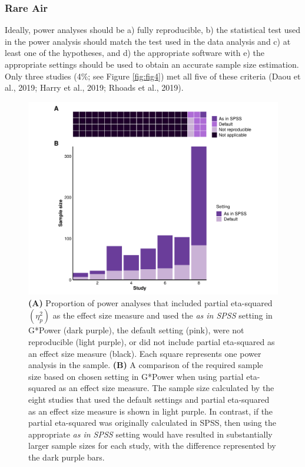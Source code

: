 \documentclass[
  man, donotrepeattitle,mask,floatsintext]{apa7}
\begin{document}
\hypertarget{rare-air}{%
\subsubsection{Rare Air}\label{rare-air}}

Ideally, power analyses should be a) fully reproducible, b) the statistical test used in the power analysis should match the test used in the data analysis and c) at least one of the hypotheses, and d) the appropriate software with e) the appropriate settings should be used to obtain an accurate sample size estimation. Only three studies (4\%; see Figure \ref{fig:fig4}) met all five of these criteria (Daou et al., 2019; Harry et al., 2019; Rhoads et al., 2019).

\clearpage

\begin{figure}

{\centering \includegraphics{../../figs/fig3} 

}

\caption{\normalfont
\textbf{(A)} Proportion of power analyses that included partial eta-squared \((\eta_{p}^2)\) as the effect size measure and used the \emph{as in SPSS} setting in G*Power (dark purple), the default setting (pink), were not reproducible (light purple), or did not include partial eta-squared as an effect size measure (black). Each square represents one power analysis in the sample. \textbf{(B)} A comparison of the required sample size based on chosen setting in G*Power when using partial eta-squared as an effect size measure. The sample size calculated by the eight studies that used the default settings and partial eta-squared as an effect size measure is shown in light purple. In contrast, if the partial eta-squared was originally calculated in SPSS, then using the appropriate \emph{as in SPSS} setting would have resulted in substantially larger sample sizes for each study, with the difference represented by the dark purple bars.}\label{fig:fig3}
\end{figure}
\end{document}
